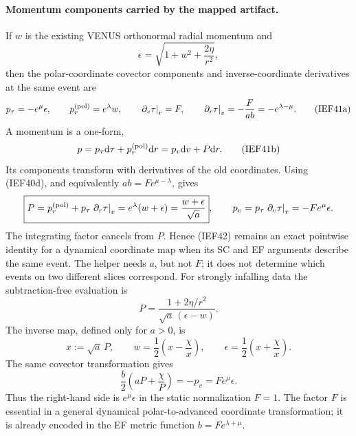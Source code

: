 \paragraph{Momentum components carried by the mapped artifact.}
If \(w\) is the existing VENUS orthonormal radial momentum and
\[
 \epsilon=\sqrt{1+w^2+\frac{2\eta}{r^2}},
\]
then the polar-coordinate covector components and inverse-coordinate
derivatives at the same event are
\[
 p_\tau=-e^\mu\epsilon,\qquad
 p_r^{({\rm pol})}=e^\lambda w,\qquad
 \left.\partial_v\tau\right|_r=F,\qquad
 \left.\partial_r\tau\right|_v=-\frac{F}{ab}
 =-e^{\lambda-\mu}.                                    \tag{IEF41a}
\]
A momentum is a one-form,
\[
 p=p_\tau\mathrm d\tau+p_r^{({\rm pol})}\mathrm d r
   =p_v\mathrm d v+P\mathrm d r.                                  \tag{IEF41b}
\]
Its components transform with derivatives of the old coordinates.  Using
(IEF40d), and equivalently \(ab=F e^{\mu-\lambda}\), gives
\[
 \boxed{
 P=p_r^{({\rm pol})}+p_\tau
       \left.\partial_r\tau\right|_v
  =e^\lambda(w+\epsilon)
  =\frac{w+\epsilon}{\sqrt a}},\qquad
 p_v=p_\tau\left.\partial_v\tau\right|_r
    =-F e^\mu\epsilon.
\]
The integrating factor cancels from \(P\).  Hence (IEF42) remains an exact
pointwise identity for a dynamical coordinate map when its SC and EF
arguments describe the same event.  The helper needs \(a\), but not \(F\);
it does not determine which events on two different slices correspond.
For strongly infalling data the subtraction-free evaluation is
\[
 P=\frac{1+2\eta/r^2}{\sqrt a\,(\epsilon-w)}.
\]
The inverse map, defined only for \(a>0\), is
\[
 x:=\sqrt a\,P,\qquad
 w=\frac12\left(x-\frac{\chi}{x}\right),\qquad
 \epsilon=\frac12\left(x+\frac{\chi}{x}\right).       \tag{IEF44}
\]
The same covector transformation gives
\[
 \frac b2\left(aP+\frac\chi P\right)
 =-p_v=F e^\mu\epsilon.                               \tag{IEF45}
\]
Thus the right-hand side is \(e^\mu\epsilon\) in the static normalization
\(F=1\).  The factor \(F\) is essential in a general dynamical
polar-to-advanced coordinate transformation; it is already encoded in the EF
metric function \(b=F e^{\lambda+\mu}\).

